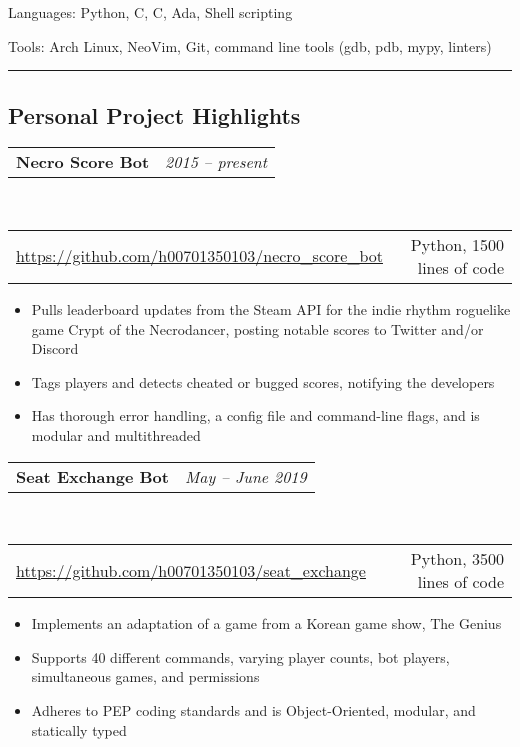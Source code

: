 \documentclass[10pt,letterpaper]{article}
\makeatletter
\newenvironment{indentsection}[1]%
{\begin{list}{}%
	{\setlength{\leftmargin}{#1}}%
	\item[]%
}
{\end{list}}
\newcommand{\headerrow}[2]
{\begin{tabular*}{\linewidth}{l@{\extracolsep{\fill}}r}
	#1 &
	#2 \\
\end{tabular*}}
\newcommand{\CPP}
{C\nolinebreak[4]\hspace{-.05em}\raisebox{.22ex}{\footnotesize\bf ++}}
\makeatother
\begin{document}
\begin{indentsection}{\parindent}
\begin{description*}
    \item[Languages:]
        Python, \CPP, C, Ada, Shell scripting
    \item[Tools:]
        Arch Linux, NeoVim, Git, command line tools (gdb, pdb, mypy, linters)
\end{description*}
\end{indentsection}

\hrule
\vspace{-0.4em}
\subsection*{Personal Project Highlights}


\headerrow
    {\textbf{Necro Score Bot}}
    {\emph{2015 -- present}}
\\
\headerrow
    {\url{https://github.com/h00701350103/necro\_score\_bot}}
    {Python, 1500 lines of code}
\begin{itemize}[noitemsep, topsep=0pt]
    \item Pulls leaderboard updates from the Steam API for the indie rhythm
        roguelike game Crypt of the Necrodancer, posting notable scores to
        Twitter and/or Discord
    \item Tags players and detects cheated or bugged scores, notifying the
        developers
    \item Has thorough error handling, a config file and command-line
        flags, and is modular and multithreaded
\end{itemize}

\vspace{0.5em}
\headerrow
    {\textbf{Seat Exchange Bot}}
    {\emph{May -- June 2019}}
\\
\headerrow
    {\url{https://github.com/h00701350103/seat\_exchange}}
    {Python, 3500 lines of code}
\begin{itemize}[noitemsep, topsep=0pt]
    \item Implements an adaptation of a game from a Korean game show, The
        Genius
    \item Supports 40 different commands, varying player counts,
        bot players, simultaneous games, and permissions
    \item Adheres to PEP coding standards and is Object-Oriented, modular,
        and statically typed
\end{itemize}
\end{document}
